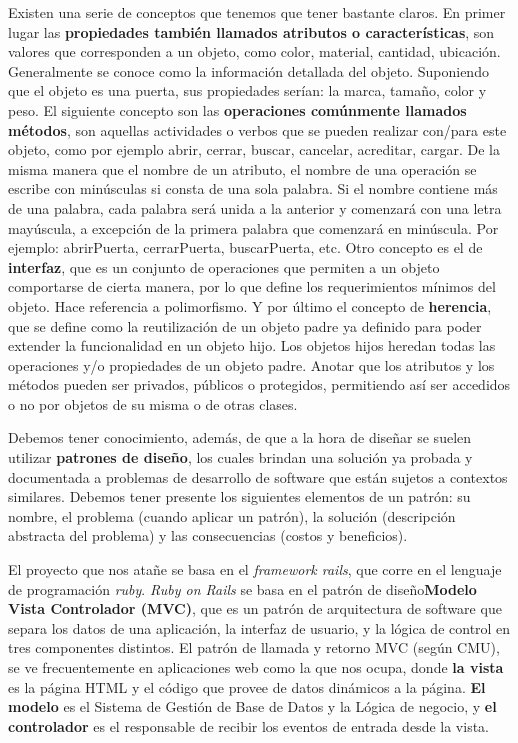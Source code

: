 			Existen una serie de conceptos que tenemos que tener bastante claros. En primer lugar las \textbf{propiedades también llamados atributos o características}, son valores que corresponden a un objeto, como color, material, cantidad, ubicación. Generalmente se conoce como la información detallada del objeto. Suponiendo que el objeto es una puerta, sus propiedades serían: la marca, tamaño, color y peso.	El siguiente concepto son las \textbf{operaciones comúnmente llamados métodos}, son aquellas actividades o verbos que se pueden realizar con/para este objeto, como por ejemplo abrir, cerrar, buscar, cancelar, acreditar, cargar. De la misma manera que el nombre de un atributo, el nombre de una operación se escribe con minúsculas si consta de una sola palabra. Si el nombre contiene más de una palabra, cada palabra será unida a la anterior y comenzará con una letra mayúscula, a excepción de la primera palabra que comenzará en minúscula. Por ejemplo: abrirPuerta, cerrarPuerta, buscarPuerta, etc. Otro concepto es el de \textbf{interfaz}, que es un conjunto de operaciones que permiten a un objeto comportarse de cierta manera, por lo que define los requerimientos mínimos del objeto. Hace referencia a polimorfismo. Y por último el concepto de \textbf{herencia}, que se define como la reutilización de un objeto padre ya definido para poder extender la funcionalidad en un objeto hijo. Los objetos hijos heredan todas las operaciones y/o propiedades de un objeto padre. Anotar que los atributos y los métodos pueden ser privados, públicos o protegidos, permitiendo así ser accedidos o no por objetos de su misma o de otras clases. 

			Debemos tener conocimiento, además, de que a la hora de diseñar se suelen utilizar \textbf{patrones de diseño}, los cuales brindan una solución ya probada y documentada a problemas de desarrollo de software que están sujetos a contextos similares. Debemos tener presente los siguientes elementos de un patrón: su nombre, el problema (cuando aplicar un patrón), la solución (descripción abstracta del problema) y las consecuencias (costos y beneficios).

			El proyecto que nos atañe se basa en el \textit{framework rails}, que corre en el lenguaje de programación \textit{ruby}. \textit{Ruby on Rails} se basa en el patrón de diseño\textbf{Modelo Vista Controlador (MVC)}, que es un patrón de arquitectura de software que separa los datos de una aplicación, la interfaz de usuario, y la lógica de control en tres componentes distintos. El patrón de llamada y retorno MVC (según CMU), se ve frecuentemente en aplicaciones web como la que nos ocupa, donde \textbf{la vista} es la página HTML y el código que provee de datos dinámicos a la página. \textbf{El modelo} es el Sistema de Gestión de Base de Datos y la Lógica de negocio, y \textbf{el controlador} es el responsable de recibir los eventos de entrada desde la vista. 	

